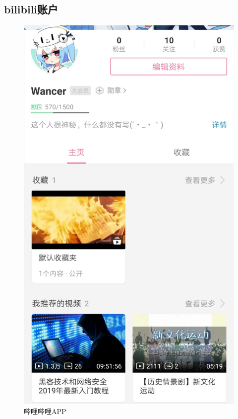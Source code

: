\documentclass{article}
\begin{document}
\subsection{bilibili账户}
\begin{figure}[h!]
		  	  \centering
		  	  \includegraphics[scale=0.11]{bilibili}
		  	  \caption{哔哩哔哩APP}
		  	  \label{fig:bilibili}
		  \end{figure}

\hspace*{\fill} \\



\end{document}
